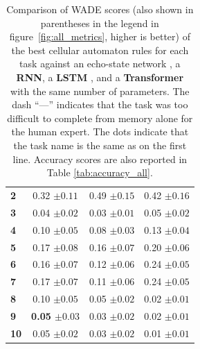 \begin{table}[htbp]
\begin{tabular}{p{7cm}ccc}
      \bfseries 2 \dotfill&  0.32 ${\scriptscriptstyle \pm0.11 }$  &  0.49 ${\scriptscriptstyle \pm0.15 }$&  0.42 ${\scriptscriptstyle \pm0.16 }$ \\
      \bfseries 3 \dotfill&  0.04 ${\scriptscriptstyle \pm0.02 }$  &  0.03 ${\scriptscriptstyle \pm0.01 }$&  0.05 ${\scriptscriptstyle \pm0.02 }$ \\
      \bfseries 4 \dotfill&  0.10 ${\scriptscriptstyle \pm0.05 }$  &  0.08 ${\scriptscriptstyle \pm0.03 }$&  0.13 ${\scriptscriptstyle \pm0.04 }$ \\
      \bfseries 5 \dotfill&  0.17 ${\scriptscriptstyle \pm0.08 }$  &  0.16 ${\scriptscriptstyle \pm0.07 }$&  0.20 ${\scriptscriptstyle \pm0.06 }$ \\
      \bfseries 6 \dotfill&  0.16 ${\scriptscriptstyle \pm0.07 }$  &  0.12 ${\scriptscriptstyle \pm0.06 }$&  0.24 ${\scriptscriptstyle \pm0.05 }$ \\
      \bfseries 7 \dotfill&  0.17 ${\scriptscriptstyle \pm0.07 }$  &  0.11 ${\scriptscriptstyle \pm0.06 }$&  0.24 ${\scriptscriptstyle \pm0.05 }$ \\
      \bfseries 8 \dotfill&  0.10 ${\scriptscriptstyle \pm0.05 }$ &  0.05 ${\scriptscriptstyle \pm0.02 }$  & 0.02 ${\scriptscriptstyle \pm0.01 }$ \\
      \bfseries 9 \dotfill& \bfseries 0.05 ${\scriptscriptstyle \pm0.03 }$ &  0.03 ${\scriptscriptstyle \pm0.02 }$ &  0.02 ${\scriptscriptstyle \pm0.01 }$\\
      \bfseries 10 \dotfill&  0.05 ${\scriptscriptstyle \pm0.02 }$ &  0.03 ${\scriptscriptstyle \pm0.02 }$  &  0.01 ${\scriptscriptstyle \pm0.01 }$\\
      \bottomrule
    \end{tabular}
    \caption{Comparison of WADE scores (also shown in parentheses in the legend
      in figure~\ref{fig:all_metrics}, higher is better) of the best cellular
      automaton rules \parencite[\textbf{ReCA},
      ][]{yilmazReservoirComputingUsing2014} for each task against an echo-state
      network \parencite[\textbf{ESN},][]{jaegerEchoStateApproach2001}, a
      \textbf{RNN}, a \textbf{LSTM} \parencite{hochreiterLongShortTermMemory1997},
      and a
      \textbf{Transformer} \parencite{vaswaniAttentionAllYou2017} with the same number of parameters.
      The dash ``---'' indicates that the task was too difficult to complete from
      memory alone for the human expert. The dots indicate that the task name is the same as on the first line. Accuracy scores are also reported in
      Table \ref{tab:accuracy_all}.}\label{tab:summary}
\end{table}

